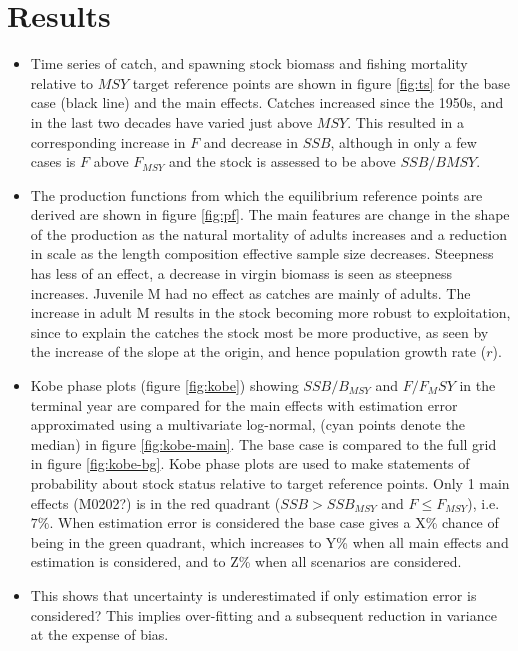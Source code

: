 \section*{Results}

\begin{itemize}
   \item Time series of catch, and spawning stock biomass and fishing mortality relative to $MSY$ target reference points are shown in figure \ref{fig:ts} for the base case (black line) and the main effects. Catches increased since the 1950s, and in the last two decades have varied just above $MSY$. This resulted in a corresponding increase in $F$ and decrease in $SSB$, although in only a few cases is $F$ above $F_{MSY}$ and the stock is assessed to be above $SSB/B{MSY}$.  

   \item The production functions from which the equilibrium reference points are derived are shown in figure \ref{fig:pf}. The main features are change in the shape of the production as the natural mortality of adults increases and a reduction in scale as the length composition effective sample size decreases. Steepness has less of an effect, a decrease in virgin biomass is seen as steepness increases. Juvenile M had no effect as catches are mainly of adults. The increase in adult M results in the stock becoming more robust to exploitation, since to explain the catches the stock most be more productive, as seen by the increase of the slope at the origin, and hence population growth rate ($r$).   

   \item Kobe phase plots (figure \ref{fig:kobe}) showing $SSB/B_{MSY}$ and $F/F_MSY$ in the terminal year are compared for the main effects with estimation error approximated using a multivariate log-normal, (cyan points denote the median) in figure \ref{fig:kobe-main}. The base case is compared to the full grid in figure \ref{fig:kobe-bg}. Kobe phase plots are used to make statements of probability about stock status relative to target reference points. Only 1 main effects (M0202?) is in the red quadrant ($SSB \gt SSB_{MSY}$ and $F \le F_{MSY}$), i.e. $7\%$. When estimation error is considered the base case gives a X\% chance of being in the green quadrant, which increases to Y\% when all main effects and estimation is considered, and to Z\% when all scenarios are considered. 
   
   \item This shows that uncertainty is underestimated if only estimation error is considered? This implies over-fitting and a subsequent reduction in variance at the expense of bias. 
   

\end{itemize}

